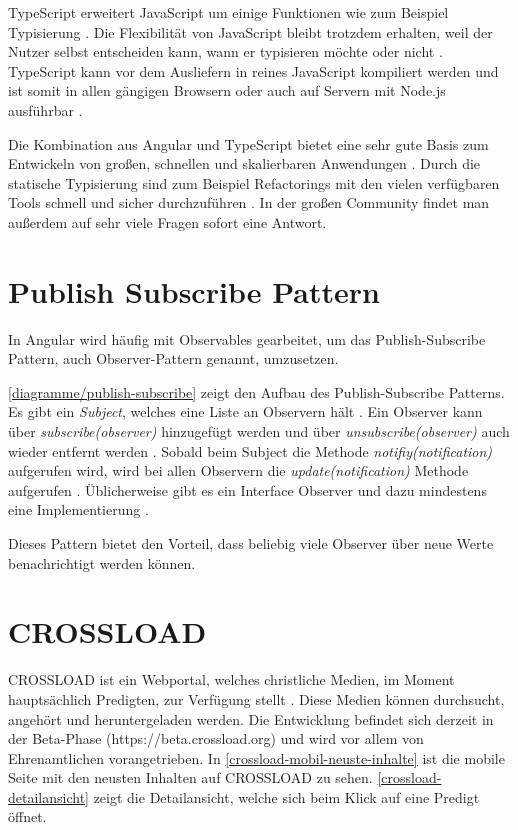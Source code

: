 TypeScript erweitert JavaScript um einige Funktionen wie zum Beispiel Typisierung \autocite{typescript-org}. Die Flexibilität von JavaScript bleibt trotzdem erhalten, weil der Nutzer selbst entscheiden kann, wann er typisieren möchte oder nicht \autocite{typescript-org}. TypeScript kann vor dem Ausliefern in reines JavaScript kompiliert werden und ist somit in allen gängigen Browsern oder auch auf Servern mit Node.js ausführbar \autocite{typescript-org}.

Die Kombination aus Angular und TypeScript bietet eine sehr gute Basis zum Entwickeln von großen, schnellen und skalierbaren Anwendungen \autocite{angular-io}. Durch die statische Typisierung sind zum Beispiel Refactorings mit den vielen verfügbaren Tools schnell und sicher durchzuführen \autocite{typescript-org} \autocite{angular-io}. In der großen Community findet man außerdem auf sehr viele Fragen sofort eine Antwort.

\section{Publish Subscribe Pattern}
In Angular wird häufig mit Observables gearbeitet, um das Publish-Subscribe Pattern, auch Observer-Pattern genannt, umzusetzen. 


\autoref{diagramme/publish-subscribe} zeigt den Aufbau des Publish-Subscribe Patterns. Es gibt ein \textit{Subject}, welches eine Liste an Observern hält \autocite{Mezzalira2018}. Ein Observer kann über \textit{subscribe(observer)} hinzugefügt werden und über \textit{unsubscribe(observer)} auch wieder entfernt werden \autocite{Mezzalira2018}. Sobald beim Subject die Methode \textit{notifiy(notification)} aufgerufen wird, wird bei allen Observern die \textit{update(notification)} Methode aufgerufen \autocite{Mezzalira2018}. Üblicherweise gibt es ein Interface Observer und dazu mindestens eine Implementierung \autocite{Mezzalira2018}.

Dieses Pattern bietet den Vorteil, dass beliebig viele Observer über neue Werte benachrichtigt werden können. 

\section{CROSSLOAD}
CROSSLOAD ist ein Webportal, welches christliche Medien, im Moment hauptsächlich Predigten, zur Verfügung stellt \autocite{crossload-org}. Diese Medien können durchsucht, angehört und heruntergeladen werden. Die Entwicklung befindet sich derzeit in der Beta-Phase (https://beta.crossload.org) und wird vor allem von Ehrenamtlichen vorangetrieben. In \autoref{crossload-mobil-neuste-inhalte} ist die mobile Seite mit den neusten Inhalten auf CROSSLOAD zu sehen. \autoref{crossload-detailansicht} zeigt die Detailansicht, welche sich beim Klick auf eine Predigt öffnet.

